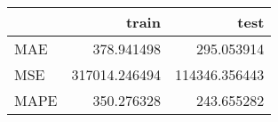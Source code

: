 \begin{tabular}{lrr}
\toprule
{} &          train &           test \\
\midrule
MAE  &     378.941498 &     295.053914 \\
MSE  &  317014.246494 &  114346.356443 \\
MAPE &     350.276328 &     243.655282 \\
\bottomrule
\end{tabular}

